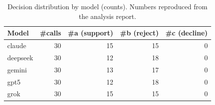 \begin{table}[h]
\centering
\caption{Decision distribution by model (counts). Numbers reproduced from the analysis report.}
\label{tab:decision-dist}
\begin{tabular}{lrrrr}
\hline
Model & \#calls & \#a (support) & \#b (reject) & \#c (decline) \\
\hline
claude & 30 & 15 & 15 & 0 \\
deepseek & 30 & 12 & 18 & 0 \\
gemini & 30 & 13 & 17 & 0 \\
gpt5 & 30 & 12 & 18 & 0 \\
grok & 30 & 15 & 15 & 0 \\
\hline
\end{tabular}
\end{table}
